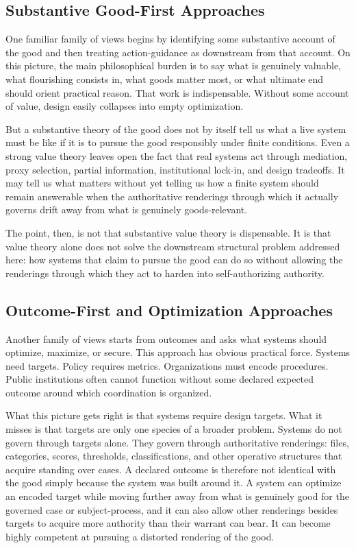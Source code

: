 \documentclass[11pt]{article}
\begin{document}
\subsection{Substantive Good-First Approaches}

One familiar family of views begins by identifying some substantive account of the good and then treating action-guidance as downstream from that account. On this picture, the main philosophical burden is to say what is genuinely valuable, what flourishing consists in, what goods matter most, or what ultimate end should orient practical reason. That work is indispensable.\cite{Sen1999DevelopmentFreedom,Nussbaum2006FrontiersJustice} Without some account of value, design easily collapses into empty optimization.

But a substantive theory of the good does not by itself tell us what a live system must be like if it is to pursue the good responsibly under finite conditions. Even a strong value theory leaves open the fact that real systems act through mediation, proxy selection, partial information, institutional lock-in, and design tradeoffs. It may tell us what matters without yet telling us how a finite system should remain answerable when the authoritative renderings through which it actually governs drift away from what is genuinely goods-relevant.

The point, then, is not that substantive value theory is dispensable. It is that value theory alone does not solve the downstream structural problem addressed here: how systems that claim to pursue the good can do so without allowing the renderings through which they act to harden into self-authorizing authority.

\subsection{Outcome-First and Optimization Approaches}

Another family of views starts from outcomes and asks what systems should optimize, maximize, or secure. This approach has obvious practical force. Systems need targets. Policy requires metrics. Organizations must encode procedures. Public institutions often cannot function without some declared expected outcome around which coordination is organized.

What this picture gets right is that systems require design targets. What it misses is that targets are only one species of a broader problem. Systems do not govern through targets alone. They govern through authoritative renderings: files, categories, scores, thresholds, classifications, and other operative structures that acquire standing over cases. A declared outcome is therefore not identical with the good simply because the system was built around it. A system can optimize an encoded target while moving further away from what is genuinely good for the governed case or subject-process, and it can also allow other renderings besides targets to acquire more authority than their warrant can bear. It can become highly competent at pursuing a distorted rendering of the good.\cite{Campbell1979AssessingImpactPlannedSocialChange,ManheimGarrabrant2019GoodhartsLaw,Strathern1997ImprovingRatings}
\end{document}
